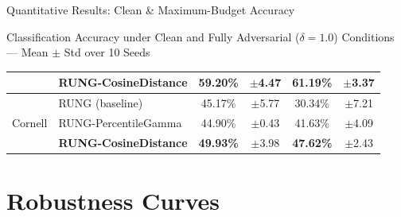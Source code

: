\documentclass[aspectratio=169]{beamer}
\begin{document}
\begin{frame}{Quantitative Results: Clean \& Maximum-Budget Accuracy}
\begin{block}{\tiny Classification Accuracy under Clean and Fully Adversarial ($\delta = 1.0$) Conditions --- Mean $\pm$ Std over 10 Seeds}
\begin{tabular}{llcccc}
        & \textbf{RUNG-CosineDistance} & \textbf{59.20\%} & $\pm$4.47 & \textbf{61.19\%} & $\pm$3.37 \\
      \midrule
      \multirow{3}{*}{Cornell}
        & RUNG (baseline)        & 45.17\% & $\pm$5.77 & 30.34\% & $\pm$7.21 \\
        & RUNG-PercentileGamma   & 44.90\% & $\pm$0.43 & 41.63\% & $\pm$4.09 \\
        & \textbf{RUNG-CosineDistance} & \textbf{49.93\%} & $\pm$3.98 & \textbf{47.62\%} & $\pm$2.43 \\
      \bottomrule
    \end{tabular}
  \end{block}
\end{frame}

\section{Robustness Curves}
\end{document}

